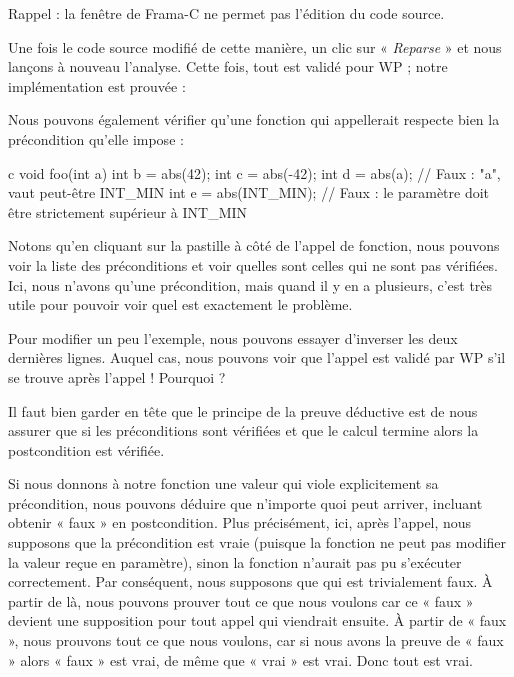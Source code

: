\begin{Warning}
Rappel : la fenêtre de Frama-C ne permet pas l'édition du code source.
\end{Warning}


Une fois le code source modifié de cette manière, un clic sur « \textit{Reparse} » et 
nous lançons à nouveau l'analyse. Cette fois, tout est validé pour WP ; notre 
implémentation est prouvée :





Nous pouvons également vérifier qu'une fonction qui appellerait  
respecte bien la précondition qu'elle impose :



\begin{CodeBlock}{c}
void foo(int a){
   int b = abs(42);
   int c = abs(-42);
   int d = abs(a);       // Faux : "a", vaut peut-être INT_MIN
   int e = abs(INT_MIN); // Faux : le paramètre doit être strictement supérieur à INT_MIN
}
\end{CodeBlock}




Notons qu'en cliquant sur la pastille à côté de l'appel de fonction, nous
pouvons voir la liste des préconditions et voir quelles sont celles qui ne sont
pas vérifiées. Ici, nous n'avons qu'une précondition, mais quand il y en a
plusieurs, c'est très utile pour pouvoir voir quel est exactement le problème.




Pour modifier un peu l'exemple, nous pouvons essayer d'inverser les deux 
dernières lignes. Auquel cas, nous pouvons voir que l'appel 
est validé par WP s'il se trouve après l'appel  ! 
Pourquoi ?



Il faut bien garder en tête que le principe de la preuve déductive est de nous
assurer que si les préconditions sont vérifiées et que le calcul termine alors
la postcondition est vérifiée.


Si nous donnons à notre fonction une valeur qui viole explicitement sa
précondition, nous pouvons déduire que n'importe quoi peut arriver, incluant
obtenir « faux » en postcondition. Plus précisément, ici, après l'appel, nous
supposons que la précondition est vraie (puisque la fonction ne peut pas
modifier la valeur reçue en paramètre), sinon la fonction n'aurait pas pu
s'exécuter correctement. Par conséquent, nous supposons que
 qui est trivialement faux. À partir de là,
nous pouvons  prouver tout ce que nous voulons car ce « faux » devient une supposition pour
tout appel qui viendrait ensuite. À partir de « faux », nous prouvons tout ce
que 
nous voulons, car si nous avons la preuve de « faux » alors « faux » est vrai,
de même que « vrai » est vrai. Donc tout est vrai.



